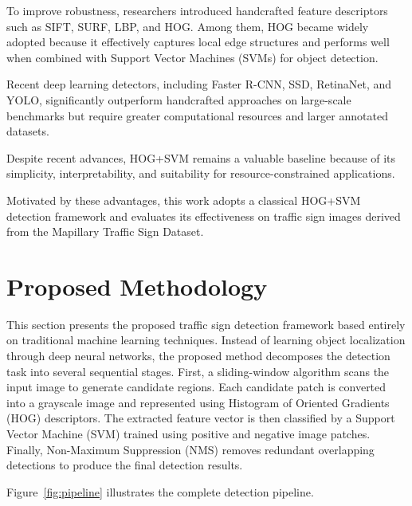 \documentclass[11pt,a4paper,twoside]{article}
\begin{document}
To improve robustness, researchers introduced handcrafted feature descriptors such as SIFT, SURF, LBP, and HOG. Among them, HOG became widely adopted because it effectively captures local edge structures and performs well when combined with Support Vector Machines (SVMs) for object detection.

Recent deep learning detectors, including Faster R-CNN, SSD, RetinaNet, and YOLO, significantly outperform handcrafted approaches on large-scale benchmarks but require greater computational resources and larger annotated datasets.

Despite recent advances, HOG+SVM remains a valuable baseline because of its simplicity, interpretability, and suitability for resource-constrained applications.

Motivated by these advantages, this work adopts a classical HOG+SVM detection framework and evaluates its effectiveness on traffic sign images derived from the Mapillary Traffic Sign Dataset.



\section{Proposed Methodology}

This section presents the proposed traffic sign detection framework based entirely on traditional machine learning techniques. Instead of learning object localization through deep neural networks, the proposed method decomposes the detection task into several sequential stages. First, a sliding-window algorithm scans the input image to generate candidate regions. Each candidate patch is converted into a grayscale image and represented using Histogram of Oriented Gradients (HOG) descriptors. The extracted feature vector is then classified by a Support Vector Machine (SVM) trained using positive and negative image patches. Finally, Non-Maximum Suppression (NMS) removes redundant overlapping detections to produce the final detection results.

Figure~\ref{fig:pipeline} illustrates the complete detection pipeline.
\end{document}
